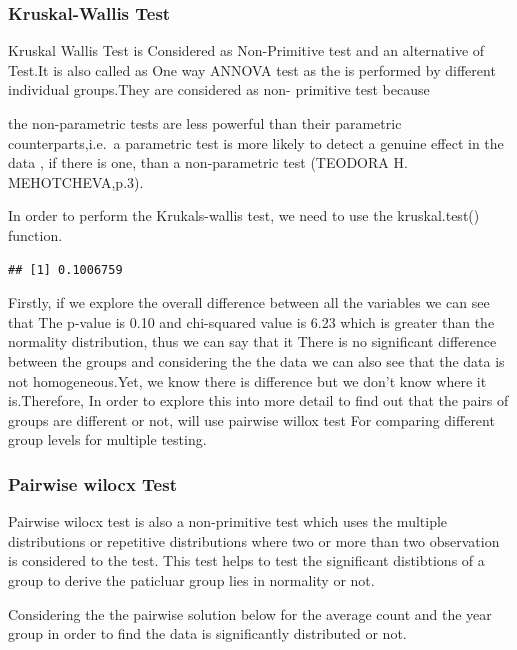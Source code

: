 \documentclass[
]{article}
\begin{document}
\hypertarget{kruskal-wallis-test}{%
\subsubsection{Kruskal-Wallis Test}\label{kruskal-wallis-test}}

Kruskal Wallis Test is Considered as Non-Primitive test and an
alternative of Test.It is also called as One way ANNOVA test as the is
performed by different individual groups.They are considered as non-
primitive test because

the non-parametric tests are less powerful than their parametric
counterparts,i.e.~a parametric test is more likely to detect a genuine
effect in the data , if there is one, than a non-parametric test
(TEODORA H. MEHOTCHEVA,p.3).

In order to perform the Krukals-wallis test, we need to use the
kruskal.test() function.

\begin{verbatim}
## [1] 0.1006759
\end{verbatim}

Firstly, if we explore the overall difference between all the variables
we can see that The p-value is 0.10 and chi-squared value is 6.23 which
is greater than the normality distribution, thus we can say that it
There is no significant difference between the groups and considering
the the data we can also see that the data is not homogeneous.Yet, we
know there is difference but we don't know where it is.Therefore, In
order to explore this into more detail to find out that the pairs of
groups are different or not, will use pairwise willox test For comparing
different group levels for multiple testing.

\hypertarget{pairwise-wilocx-test}{%
\subsubsection{Pairwise wilocx Test}\label{pairwise-wilocx-test}}

Pairwise wilocx test is also a non-primitive test which uses the
multiple distributions or repetitive distributions where two or more
than two observation is considered to the test. This test helps to test
the significant distibtions of a group to derive the paticluar group
lies in normality or not.

Considering the the pairwise solution below for the average count and
the year group in order to find the data is significantly distributed or
not.
\end{document}
